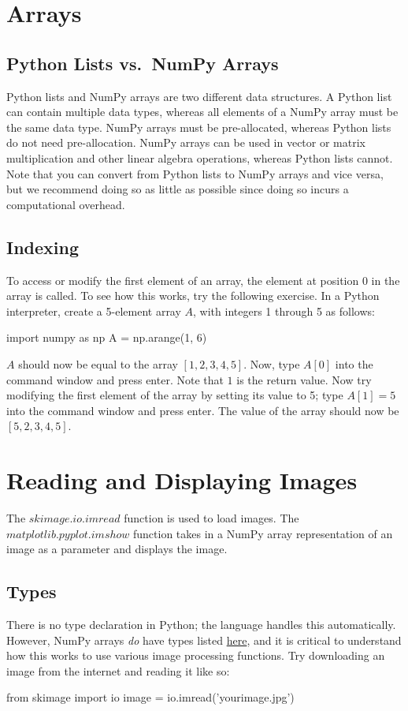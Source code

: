 \documentclass{article}
\begin{document}
\section{Arrays}
\subsection{Python Lists vs.~NumPy Arrays}
Python lists and NumPy arrays are two different data structures. A Python list can contain multiple data types, whereas all elements of a NumPy array must be the same data type. NumPy arrays must be pre-allocated, whereas Python lists do not need pre-allocation. NumPy arrays can be used in vector or matrix multiplication and other linear algebra operations, whereas Python lists cannot. Note that you can convert from Python lists to NumPy arrays and vice versa, but we recommend doing so as little as possible since doing so incurs a computational overhead.

\subsection{Indexing}
To access or modify the first element of an array, the element at position 0 in the array is called. To see how this works, try the following exercise.
In a Python interpreter, create a 5-element array $A$, with integers 1 through 5 as follows: 
\begin{python}
import numpy as np
A = np.arange(1, 6)
\end{python}

$A$ should now be equal to the array $[1,2,3,4,5]$.
Now, type $A[0]$ into the command window and press enter. Note that $1$ is the return value.
Now try modifying the first element of the array by setting its value to 5; type $A[1]=5$ into the command window and press enter. The value of the array should now be $[5,2,3,4,5]$.

\section{Reading and Displaying Images}
The \href{hhttp://scikit-image.org/docs/dev/api/skimage.io.html#skimage.io.imread}{$skimage.io.imread$} function is used to load images.
The \href{https://matplotlib.org/api/_as_gen/matplotlib.pyplot.imshow.html}{$matplotlib.pyplot.imshow$} function takes in a NumPy array representation of an image as a parameter and displays the image.

\subsection{Types}
There is no type declaration in Python; the language handles this automatically. However, NumPy arrays \textit{do} have types listed \href{https://docs.scipy.org/doc/numpy/user/basics.types.html}{here}, and it is critical to understand how this works to use various image processing functions.
Try downloading an image from the internet and reading it like so:
\begin{python}
from skimage import io
image = io.imread('yourimage.jpg')
\end{python}
\end{document}
